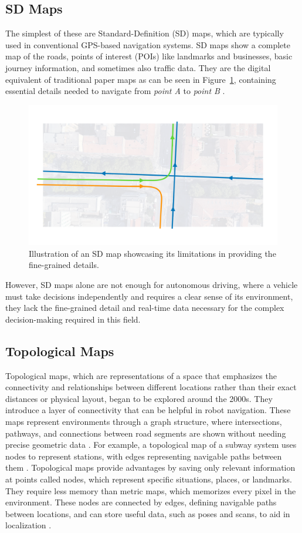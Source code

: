 \subsection{SD Maps}
The simplest of these are Standard-Definition (SD) maps, which are typically used in conventional GPS-based navigation systems. SD maps show a complete map of the roads, points of interest (POIs) like landmarks and businesses, basic journey information, and sometimes also traffic data. They are the digital equivalent of traditional paper maps as can be seen in Figure~\ref{fig:sd_map}, containing essential details needed to navigate from \textit{point A} to \textit{point B} \cite{Mudduluru_SD_vs_HD_Maps, Chiang2021}.
\begin{figure}[H]
    \centering
    \includegraphics[width=0.65\linewidth]{LateX//figs/SD_MAP_compressed.pdf}
    \caption{Illustration of an SD map showcasing its limitations in providing the fine-grained details.}
    \label{fig:sd_map}
\end{figure}
However, SD maps alone are not enough for autonomous driving, where a vehicle must take decisions independently and requires a clear sense of its environment, they lack the fine-grained detail and real-time data necessary for the complex decision-making required in this field.

\subsection{Topological Maps}
Topological maps, which are representations of a space that emphasizes the connectivity and relationships between different locations rather than their exact distances or physical layout, began to be explored around the 2000s. They introduce a layer of connectivity that can be helpful in robot navigation. These maps represent environments through a graph structure, where intersections, pathways, and connections between road segments are shown without needing precise geometric data \cite{li2020survey}. For example, a topological map of a subway system uses nodes to represent stations, with edges representing navigable paths between them \cite{8105770}.
Topological maps provide advantages by saving only relevant information at points called nodes, which represent specific situations, places, or landmarks. They require less memory than metric maps, which memorizes every pixel in the environment. These nodes are connected by edges, defining navigable paths between locations, and can store useful data, such as poses and scans, to aid in localization \cite{murciego2021topological}.

